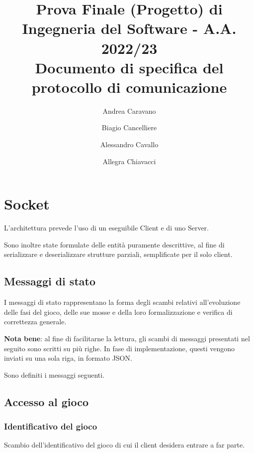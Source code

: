\documentclass[a4paper,11pt]{article} %
\begin{document}
    \pagestyle{fancy}
    \fancyhead{}\fancyfoot{}
    \fancyfoot[C]{\thepage}

    \author{Andrea Caravano \and Biagio Cancelliere \and Alessandro Cavallo \and Allegra Chiavacci}
    \title{\textbf{\Large{Prova Finale (Progetto) di Ingegneria del Software - A.A. 2022/23\\Documento di specifica del protocollo di comunicazione}}}
    \maketitle

    \tableofcontents

    \newpage


    \section{Socket}\label{sec:socket}
    L'architettura prevede l'uso di un eseguibile Client e di uno Server.

    \smallskip
    Sono inoltre state formulate delle entità puramente descrittive, al fine di serializzare e deserializzare strutture parziali, semplificate per il solo client.

    \subsection*{Messaggi di stato}

    I messaggi di stato rappresentano la forma degli scambi relativi all'evoluzione delle fasi del gioco,
    delle sue mosse e della loro formalizzazione e verifica di correttezza generale.

    \smallskip

    \textbf{Nota bene}: al fine di facilitarne la lettura, gli scambi di messaggi presentati nel seguito sono scritti su più righe.
    In fase di implementazione, questi vengono inviati su una sola riga, in formato JSON.

    \smallskip
    Sono definiti i messaggi seguenti.

    \subsection{Accesso al gioco}\label{subsec:accesso-al-gioco}

    \subsubsection{Identificativo del gioco}
    Scambio dell'identificativo del gioco di cui il client desidera entrare a far parte.
\end{document}
